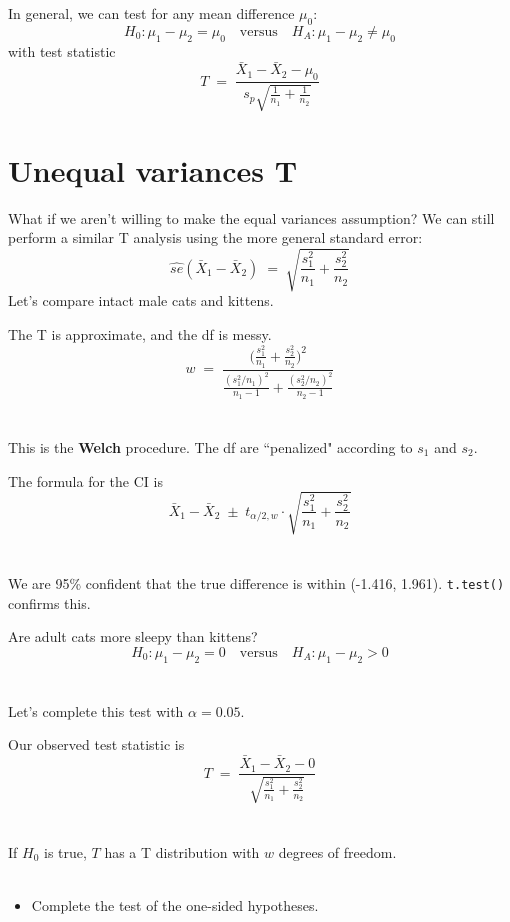 \documentclass[xcolor={dvipsnames,svgnames},14pt]{beamer}
\begin{document}
\begin{frame}
In general, we can test for any mean difference $\mu_0$:
$$H_0: \mu_1 - \mu_2 = \mu_0 \quad \text{versus} \quad H_A: \mu_1 - \mu_2 \neq \mu_0$$
with test statistic
$$T \;=\; \frac{\bar{X}_1 - \bar{X}_2 - \mu_0}{s_p \sqrt{\frac{1}{n_1} + \frac{1}{n_2}}}$$
\end{frame}

\section{Unequal variances T}

\begin{frame}
What if we aren't willing to make the equal variances assumption?  We can still perform a similar T analysis using the more general standard error:
$$\hat{se}(\bar{X}_1 - \bar{X}_2) \;=\; \sqrt{\frac{s^2_1}{n_1} + \frac{s^2_2}{n_2}}$$
Let's compare intact male cats and kittens.
\end{frame}

\begin{frame}
The T is approximate, and the df is messy.
$$w \;=\; \frac{\Big(\frac{s^2_1}{n_1} + \frac{s^2_2}{n_2}\Big)^2}{\frac{(s^2_1/n_1)^2}{n_1-1} + \frac{(s^2_2/n_2)^2}{n_2-1}}$$
\\~\\
This is the \textbf{Welch} procedure.  The df are ``penalized" according to $s_1$ and $s_2$.
\end{frame}

\begin{frame}
The formula for the CI is
$$\bar{X}_1 - \bar{X}_2 \;\pm\; t_{\alpha/2, w}\cdot \sqrt{\frac{s^2_1}{n_1} + \frac{s^2_2}{n_2}}$$
\\~\\
We are 95\% confident that the true difference is within (-1.416, 1.961).  \texttt{t.test()} confirms this.
\end{frame}


\begin{frame}
Are adult cats more sleepy than kittens?
$$H_0: \mu_1 - \mu_2 = 0 \quad \text{versus}\quad H_A: \mu_1 - \mu_2 > 0$$
\\~\\
Let's complete this test with $\alpha = 0.05$.
\end{frame}

\begin{frame}
Our observed test statistic is 
$$T \;=\; \frac{\bar{X}_1 - \bar{X}_2 - 0}{\sqrt{\frac{s^2_1}{n_1} + \frac{s^2_2}{n_2}}}$$ 
\\~\\
If $H_0$ is true, $T$ has a T distribution with $w$ degrees of freedom. \\~\\ \begin{itemize}
\item Complete the test of the one-sided hypotheses.
\end{itemize}
\end{frame}
\end{document}
